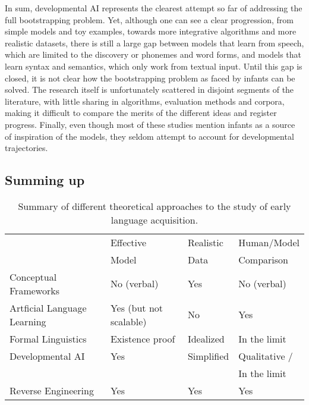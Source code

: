 \documentclass[jou,apacite]{apa6}
\begin{document}
In sum, developmental AI represents the clearest attempt so far of addressing the full bootstrapping problem. Yet, although one can see a clear progression, from simple models and toy examples, towards more integrative algorithms and more realistic datasets, there is 
still a large gap between models that learn from speech, which are limited to the discovery or phonemes and word forms, and models that learn syntax and semantics, which only work from textual input. Until this gap is closed, it is not clear how the bootstrapping problem as faced by infants can be solved. The research itself is unfortunately scattered in disjoint segments of the literature, with little sharing in algorithms, evaluation methods and corpora, making it difficult to compare the merits of the different ideas and register progress. Finally, even though most of these studies mention  infants as a source of inspiration of the models, they seldom attempt to account for developmental trajectories.








\subsection{Summing up}


\begin{table*}[]
	\centering
	\captionsetup{justification=centering}
	\caption{Summary of different theoretical approaches to the study of early language acquisition.}
	\label{tab:pastwork}
	
	\begin{tabular}{llll}
		\hline 
		       & Effective &Realistic  & {Human/Model}    \\ 	
    	       & Model     & Data        & Comparison           \\ 	


		\hline 
		Conceptual Frameworks      &No (verbal)&  Yes           & No (verbal) \\ 
		Artficial Language Learning &Yes (but not scalable)            &  No            &   Yes          \\ 
		Formal Linguistics               &Existence proof            & Idealized   & In the limit        \\ 
		Developmental AI                &Yes            &  Simplified & Qualitative /     \\ 
		                                            &                 &                  & In the limit      \\ 

		Reverse Engineering            &Yes            & Yes             & Yes               \\ 
		\hline 
	\end{tabular} 
\end{table*}
\end{document}
